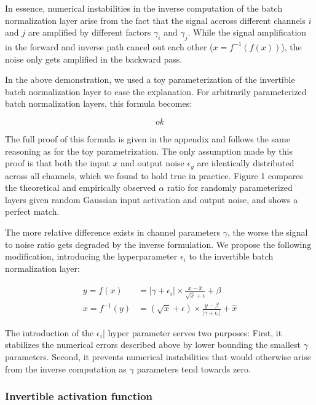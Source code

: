 \documentclass[twocolumn]{bmcart}
\begin{document}
In essence, numerical instabilities in the inverse computation of the batch normalization layer arise from the fact that the signal accross different channels $i$ and $j$ are amplified by different factors $\gamma_i$ and $\gamma_j$. While the signal amplification in the forward and inverse path cancel out each other ($x=f^{-1}(f(x))$), the noise only gets amplified in the backward pass.

In the above demonstration, we used a toy parameterization of the invertible batch normalization layer to ease the explanation. 
For arbitrarily parameterized batch normalization layers, this formula becomes:

\begin{equation}
ok
\end{equation}

The full proof of this formula is given in the appendix and follows the same reasoning as for the toy parametrization. The only assumption made by this proof is that both the input $x$ and output noise $\epsilon_y$ are identically distributed across all channels, which we found to hold true in practice. Figure 1 compares the theoretical and empirically observed  $\alpha$ ratio for randomly parameterized layers given random Gaussian input activation and output noise, and shows a perfect match.

The more relative difference exists in channel parameters $\gamma$, the worse the signal to noise ratio gets degraded by the inverse formulation.
We propose the following modification, introducing the hyperparameter $\epsilon_i$  to the invertible batch normalization layer:

\begin{subequations}
	\begin{align}
	y = f(x) &= |\gamma + \epsilon_i| \times \frac{x - \hat{x}}{\sqrt{\dot{x}} + \epsilon} + \beta \\
	x = f^{-1}(y) &= (\sqrt{\dot{x}} + \epsilon) \times \frac{y -  \beta}{|\gamma + \epsilon_i|}  + \hat{x}
	\end{align}
\end{subequations}

The introduction of the $\epsilon_i|$ hyper parameter serves two purposes: 
First, it stabilizes the numerical errors described above by lower bounding the smallest $\gamma$ parameters. 
Second, it prevents numerical instabilities that would otherwise arise from the inverse computation as $\gamma$ parameters tend towards zero. 

\subsubsection{Invertible activation function}
\end{document}
